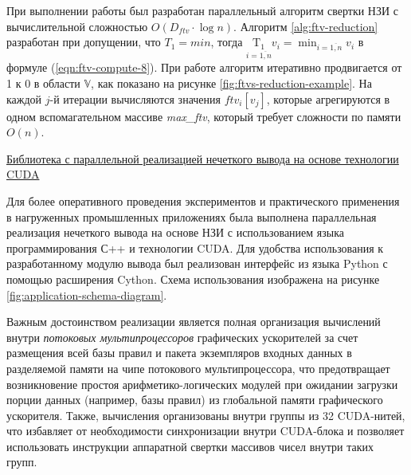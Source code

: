 При выполнении работы был разработан параллельный алгоритм свертки НЗИ \cite{Karatach2023b} с вычислительной сложностью $O\left(D_{ftv}\cdot \log{n}\right)$. Алгоритм \ref{alg:ftv-reduction} разработан при допущении, что $T_1 = min$, тогда $\underset{i=\overline{1,n}}{\mathrm{T_1}}v_i = \min_{i=\overline{1,n}} v_i$ в формуле (\ref{eqn:ftv-compute-8}). При работе алгоритм итеративно продвигается от 1 к 0 в области $\mathbb{V}$, как показано на рисунке \cref{fig:ftvs-reduction-example}. На каждой $j$-й итерации вычисляются значения $ftv_i[v_j]$, которые агрегируются в одном вспомагательном массиве \textit{max\_ftv}, который требует сложности по памяти $O\left(n\right)$.



\ul{Библиотека с параллельной реализацией нечеткого вывода на основе технологии CUDA}

Для более оперативного проведения экспериментов и практического применения в нагруженных промышленных приложениях была выполнена параллельная реализация нечеткого вывода на основе НЗИ с использованием языка программирования С++ и технологии CUDA. Для удобства использования к разработанному модулю вывода был реализован интерфейс из языка Python с помощью расширения Cython. Схема использования изображена на рисунке \cref{fig:application-schema-diagram}.

Важным достоинством реализации является полная организация вычислений внутри \textit{потоковых мультипроцессоров} графических ускорителей за счет размещения всей базы правил и пакета экземпляров входных данных в разделяемой памяти на чипе потокового мультипроцессора, что предотвращает возникновение простоя арифметико-логических модулей при ожидании загрузки порции данных (например, базы правил) из глобальной памяти графического ускорителя. Также, вычисления организованы внутри группы из 32 CUDA-нитей, что избавляет от необходимости синхронизации внутри CUDA-блока и позволяет использовать инструкции аппаратной свертки массивов чисел внутри таких групп.

